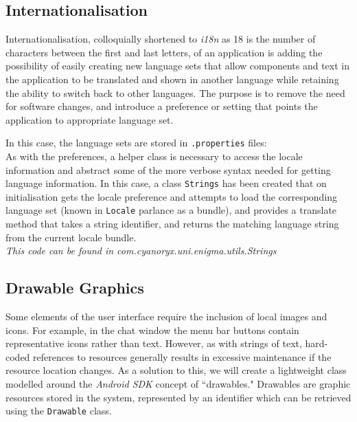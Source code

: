   \subsection{Internationalisation}
  
  Internationalisation, colloquially shortened to \emph{i18n} as 18 is the number of characters between the first and last letters, of an application is adding the possibility of easily creating new language sets that allow components and text in the application to be translated and shown in another language while retaining the ability to switch back to other languages. The purpose is to remove the need for software changes, and introduce a preference or setting that points the application to appropriate language set.
  
  In this case, the language sets are stored in \verb!.properties! files: \\
  
  
  
  As with the preferences, a helper class is necessary to access the locale information and abstract some of the more verbose syntax needed for getting language information. In this case, a class \verb!Strings! has been created that on initialisation gets the locale preference and attempts to load the corresponding language set (known in \verb!Locale! parlance as a bundle), and provides a translate method that takes a string identifier, and returns the matching language string from the current locale bundle. \\
  
  
  
  \emph{This code can be found in com.cyanoryx.uni.enigma.utils.Strings}
  
  \subsection{Drawable Graphics}
  
  Some elements of the user interface require the inclusion of local images and icons. For example, in the chat window the menu bar buttons contain representative icons rather than text. However, as with strings of text, hard-coded references to resources generally results in excessive maintenance if the resource location changes. As a solution to this, we will create a lightweight class modelled around the \emph{Android SDK} concept of ``drawables." Drawables are graphic resources stored in the system, represented by an identifier which can be retrieved using the \verb!Drawable! class.\\
  
